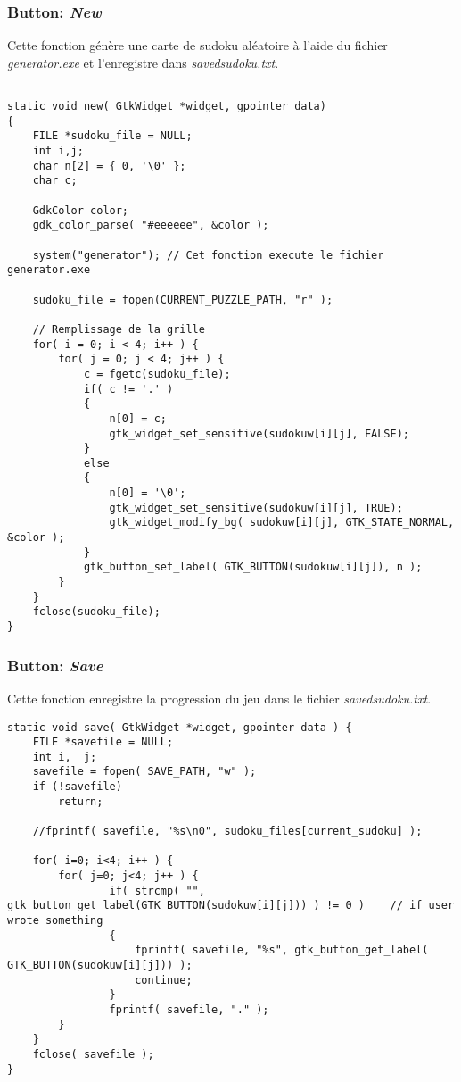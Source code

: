 \documentclass{article}
\begin{document}
\subsubsection{Button: \textit{New}}
Cette fonction génère une carte de sudoku aléatoire à l’aide du fichier \textit{generator.exe} et l’enregistre dans \textit{savedsudoku.txt}.
\begin{lstlisting}[style=CStyle]

static void new( GtkWidget *widget, gpointer data)
{
	FILE *sudoku_file = NULL;
	int i,j;
	char n[2] = { 0, '\0' };
	char c;

	GdkColor color;
	gdk_color_parse( "#eeeeee", &color );
	
	system("generator"); // Cet fonction execute le fichier generator.exe 
	
	sudoku_file = fopen(CURRENT_PUZZLE_PATH, "r" );
	
	// Remplissage de la grille
	for( i = 0; i < 4; i++ ) {
		for( j = 0; j < 4; j++ ) {
			c = fgetc(sudoku_file);
			if( c != '.' )
			{
				n[0] = c;
				gtk_widget_set_sensitive(sudokuw[i][j], FALSE);
			}
			else
			{
				n[0] = '\0';
				gtk_widget_set_sensitive(sudokuw[i][j], TRUE);
				gtk_widget_modify_bg( sudokuw[i][j], GTK_STATE_NORMAL, &color );
			}
			gtk_button_set_label( GTK_BUTTON(sudokuw[i][j]), n );
		}
	}
	fclose(sudoku_file);
}
\end{lstlisting}

\subsubsection{Button: \textit{Save}}
Cette fonction enregistre la progression du jeu dans le fichier \textit{savedsudoku.txt}.
\begin{lstlisting}[style=CStyle]
static void save( GtkWidget *widget, gpointer data ) {
	FILE *savefile = NULL;
	int i,  j;
	savefile = fopen( SAVE_PATH, "w" );
	if (!savefile)
		return;

	//fprintf( savefile, "%s\n0", sudoku_files[current_sudoku] );

	for( i=0; i<4; i++ ) {
		for( j=0; j<4; j++ ) {
				if( strcmp( "", gtk_button_get_label(GTK_BUTTON(sudokuw[i][j])) ) != 0 )	// if user wrote something
				{
					fprintf( savefile, "%s", gtk_button_get_label( GTK_BUTTON(sudokuw[i][j])) );
					continue;
				}
				fprintf( savefile, "." );
		}
	}
	fclose( savefile );
}
\end{lstlisting}
\end{document}
